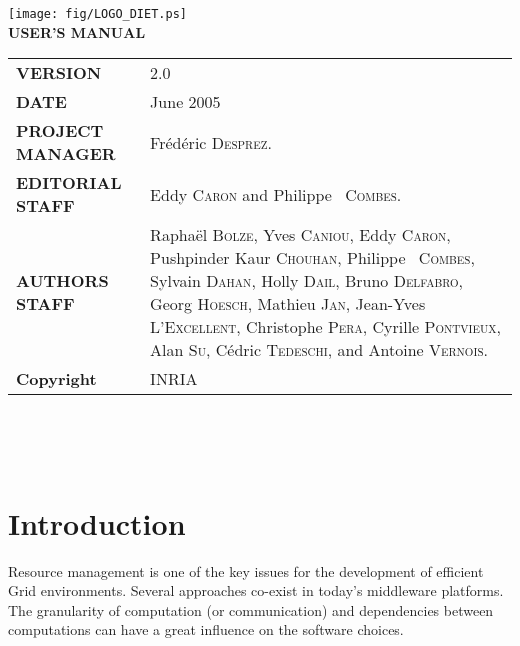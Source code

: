 \documentclass[12pt,a4paper]{book}
\newcommand{\dietversion}{2.0}
\begin{document}

\thispagestyle{empty}
\vspace*{3cm}
\vspace*{3cm}

\begin{center}
\texttt{[image: fig/LOGO\_DIET.ps]}\\[2ex]
\textbf{\Huge USER'S MANUAL\\[2ex]}
\end{center}

\vfill

\noindent
\small{
\begin{tabular}{ll}
  \textbf{VERSION}  & \dietversion\\
  \textbf{DATE}     & June 2005\\
  \textbf{PROJECT MANAGER}  & Fr\'ed\'eric \textsc{Desprez}.\\
  \textbf{EDITORIAL STAFF}  & Eddy \textsc{Caron} and Philippe ~\textsc{Combes}.\\
  \textbf{AUTHORS STAFF}    & 
\begin{minipage}[t]{12cm}
  Rapha\"el \textsc{Bolze}, Yves \textsc{Caniou}, Eddy \textsc{Caron},
  Pushpinder Kaur \textsc{Chouhan}, Philippe ~\textsc{Combes}, Sylvain
  \textsc{Dahan}, Holly \textsc{Dail}, Bruno \textsc{Delfabro}, Georg
  \textsc{Hoesch}, Mathieu \textsc{Jan}, Jean-Yves
  \textsc{L'Excellent}, Christophe \textsc{Pera}, Cyrille
  \textsc{Pontvieux}, Alan \textsc{Su}, C\'edric \textsc{Tedeschi},
  and Antoine \textsc{Vernois}.
\end{minipage} \\
  \textbf{Copyright}& INRIA
\end{tabular}\\
}

\newpage
\thispagestyle{empty}
\ 



\newpage
\tableofcontents


%
%
\newpage
{}
\chapter*{Introduction}

Resource management is one of the key issues for the development of
efficient Grid environments. Several approaches co-exist in today's
middleware platforms. The granularity of computation (or communication) and 
dependencies between computations can have a great influence on the
software choices.
\end{document}
